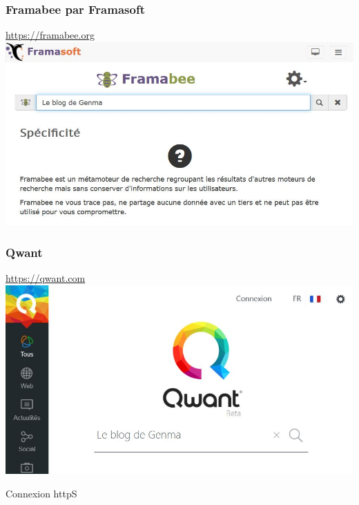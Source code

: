 \documentclass{beamer}
\begin{document}
\begin{frame}
\begin{center}
\frametitle{Framabee par Framasoft}

\url{https://framabee.org}
\\
\includegraphics[scale=0.6] {./images/Framabee.jpg}
\end{center}
\end{frame}

\begin{frame}
\begin{center}
\frametitle{Qwant}

\url{https://qwant.com}
\\
\includegraphics[scale=0.6] {./images/Qwant.jpg}
\end{center}
\end{frame}

\begin{frame}
\begin{center}
\Huge{Connexion httpS}
\end{center}
\end{frame}
\end{document}
